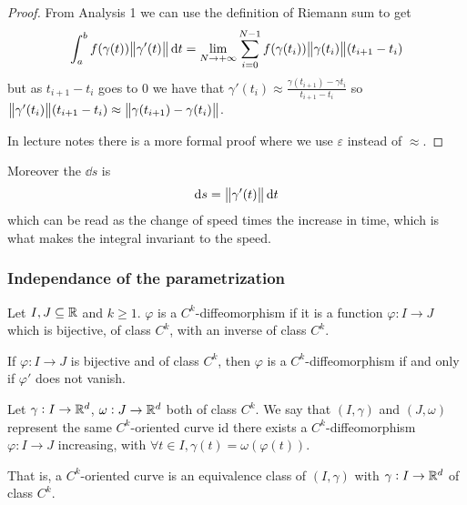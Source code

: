 \documentclass[12pt]{extarticle}
\begin{document}
\begin{proof}
    From Analysis 1 we can use the definition of Riemann sum to get
    \begin{equation}
        \int_a^b f(\gamma(t)) \norm{\gamma'(t)} \dd{t} = \lim_{N \to +\infty} \sum_{i = 0}^{N-1} f(\gamma(t_i)) \norm{\gamma(t_i)} (t_{i+1} - t_i)
    \end{equation}
    but as $t_{i+1} - t_{i}$ goes to $0$ we have that $\gamma'(t_i) \approx \frac{\gamma(t_{i+1}) - \gamma{t_i}}{t_{i+1} - t_i}$ so
    $\norm{\gamma'(t_i)} (t_{i+1} - t_i) \approx \norm{\gamma(t_{i+1}) - \gamma(t_i)}$.

    In lecture notes there is a more formal proof where we use $\varepsilon$ instead of $\approx$.
\end{proof}

Moreover the $\dd{s}$ is
\begin{equation}
    \dd{s} = \norm{\gamma'(t)} \dd{t}
\end{equation}
which can be read as the change of speed times the increase in time, which is what makes the integral invariant to the speed.

\subsubsection{Independance of the parametrization}

\begin{definition}[diffeomorphism]
    Let $I, J \subseteq \mathbb{R}$ and $k \geq 1$.
    $\varphi$ is a $C^k$-diffeomorphism if it is a function $\varphi: I \to J$ which is bijective, of class $C^k$, with an inverse of class $C^k$.
\end{definition}

\begin{proposition}
    If $\varphi: I \to J$ is bijective and of class $C^k$, then $\varphi$ is a $C^k$-diffeomorphism if and only if $\varphi'$ does not vanish.
\end{proposition}

\begin{definition}
    Let $\gamma: I \to \mathbb{R}^d$, $\omega: J \to \mathbb{R}^d$ both of class $C^k$.
    We say that $(I, \gamma)$ and $(J, \omega)$ represent the same $C^k$-oriented curve id there exists a $C^k$-diffeomorphism $\varphi: I \to J$ increasing, with $\forall t \in I, \gamma(t) = \omega(\varphi(t))$.

    That is, a $C^k$-oriented curve is an equivalence class of $(I, \gamma)$ with $\gamma: I \to \mathbb{R}^d$ of class $C^k$.
\end{definition}
\end{document}
